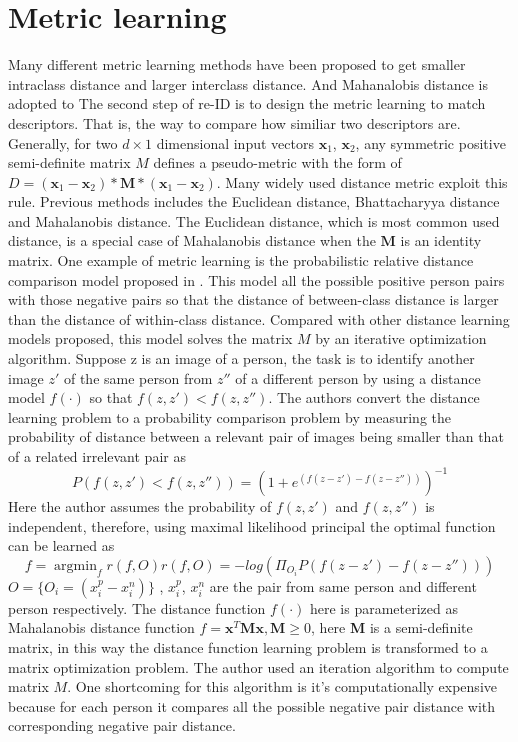 \section{Metric learning}
Many different metric learning methods have been proposed \cite{KISSME, LFDA, PCCA, TDL, PRDC, LMNN, KLFDA, KCCA, KernelVersionMetrics, NFST, ITML} to get smaller intraclass distance and larger interclass distance. And Mahanalobis distance is adopted to 
The second step of re-ID is to design the metric learning to match descriptors. That is, the way to compare how similiar two descriptors are. Generally, for two $d\times 1$ dimensional input vectors $\bm{x}_1$, $\bm{x}_2$, any symmetric positive semi-definite matrix $M$ defines a pseudo-metric with the form of $D = (\bm{x}_1 -\bm{x}_2)*\bm{M}*(\bm{x}_1 - \bm{x}_2)$. Many widely used distance metric exploit this rule. Previous methods includes the Euclidean distance, Bhattacharyya distance and Mahalanobis distance. The Euclidean distance, which is most common used distance, is a special case of Mahalanobis distance when the $\bm{M}$ is an identity matrix. One example of metric learning is the probabilistic relative distance comparison model proposed in \cite{PRDC}. This model  all the possible positive person pairs with those negative pairs so that the distance of between-class distance is larger than the distance of within-class distance. Compared with other distance learning models proposed, this model solves the matrix $M$ by an iterative optimization algorithm. Suppose z is an image of a person, the task is to identify another image $z'$ of the same person from $z''$ of a different person by using a distance model $f(\cdot)$ so that $f(z, z')< f(z, z'')$. The authors convert the distance learning problem to a probability comparison problem by measuring the probability of distance between a relevant pair of images being smaller than that of a related irrelevant pair as
\begin{equation}P(f(z,z')<f(z,z'')) = (1+e^{(f(z-z')-f(z-z''))})^{-1}\end{equation}
Here the author assumes the probability of $f(z,z')$ and $f(z,z'')$ is independent, therefore, using maximal likelihood principal the optimal function can be learned as
\begin{equation}
f = \mathop{\arg\min}_f r(f,O) 
r(f,O) = -log(\Pi_{O_i}P(f(z-z')-f(z-z'')))
\end{equation}
$O=\{O_i=(x_i^p-x_i^n)\}$ , $x_i^p$, $x_i^n$ are the pair from same person and different person respectively.
The distance function $f(\cdot)$ here is parameterized as Mahalanobis distance function
$f=\bm{x}^T\bm{M}\bm{x},\bm{M}\ge0$,
here \textbf{M} is a semi-definite matrix, in this way the distance function learning problem is transformed to a matrix optimization problem. The author used an iteration algorithm to compute matrix $M$. One shortcoming for this algorithm is it's computationally expensive because for each person it compares all the possible negative pair distance with corresponding negative pair distance. 

